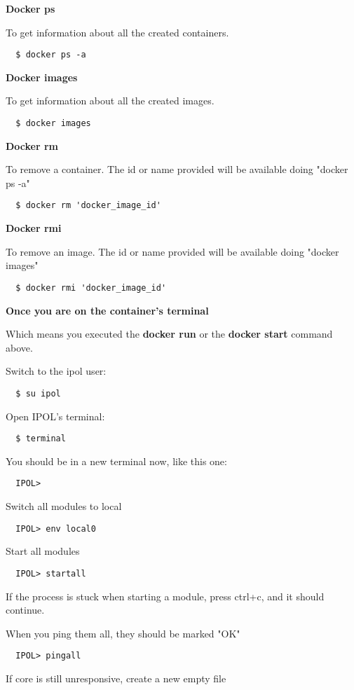 \documentclass[a4paper,12pt]{article}
\begin{document}
\textbf{Docker ps}

To get information about all the created containers.
\begin{verbatim}
  $ docker ps -a
\end{verbatim}

\textbf{Docker images}

To get information about all the created images.
\begin{verbatim}
  $ docker images
\end{verbatim}

\textbf{Docker rm}

To remove a container. The id or name provided will be available doing "docker ps -a"
\begin{verbatim}
  $ docker rm 'docker_image_id'
\end{verbatim}

\textbf{Docker rmi}

To remove an image. The id or name provided will be available doing "docker images"
\begin{verbatim}
  $ docker rmi 'docker_image_id'
\end{verbatim}

\textbf{Once you are on the container's terminal}

Which means you executed the \textbf{docker run} or the \textbf{docker start} command above.

Switch to the ipol user:
\begin{verbatim}
  $ su ipol
\end{verbatim}

Open IPOL's terminal:
\begin{verbatim}
  $ terminal
\end{verbatim}

You should be in a new terminal now, like this one:
\begin{verbatim}
  IPOL>
\end{verbatim}

Switch all modules to local
\begin{verbatim}
  IPOL> env local0
\end{verbatim}

Start all modules
\begin{verbatim}
  IPOL> startall
\end{verbatim}
If the process is stuck when starting a module, press ctrl+c, and it should continue.

When you ping them all, they should be marked "OK"
\begin{verbatim}
  IPOL> pingall
\end{verbatim}
If core is still unresponsive, create a new empty file
\end{document}
